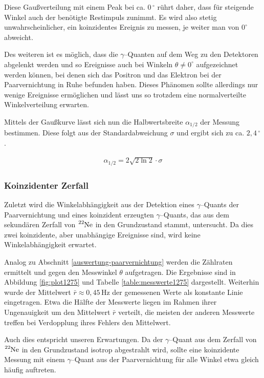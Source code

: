 \documentclass[12pt,a4paper]{scrartcl}
\numberwithin{equation}{section} %
\begin{document}
Diese Gaußverteilung mit einem Peak bei ca. $0\,^\circ$ rührt daher, dass für steigende Winkel auch der benötigte Restimpuls zunimmt. Es wird also stetig unwahrscheinlicher, ein koinzidentes Ereignis zu messen, je weiter man von $0^\circ$ abweicht.

Des weiteren ist es möglich, dass die $\gamma$--Quanten auf dem Weg zu den Detektoren abgelenkt werden und so Ereignisse auch bei Winkeln $\theta\neq 0^\circ$ aufgezeichnet werden können, bei denen sich das Positron und das Elektron bei der Paarvernichtung in Ruhe befunden haben. Dieses Phänomen sollte allerdings nur wenige Ereignisse ermöglichen und lässt uns so trotzdem eine normalverteilte Winkelverteilung erwarten.

Mittels der Gaußkurve lässt sich nun die Halbwertsbreite $\alpha_{1/2}$ der Messung bestimmen. Diese folgt aus der Standardabweichung $\sigma$ und ergibt sich zu ca. $2,4 \mathrm{\, ^\circ}$.

\begin{eqnarray}
	\alpha_{1/2} = 2 \sqrt{2 \ln 2} \cdot \sigma
\end{eqnarray}

\subsubsection{Koinzidenter Zerfall}
Zuletzt wird die Winkelabhängigkeit aus der Detektion eines $\gamma$--Quants der Paarvernichtung und eines koinzident erzeugten $\gamma$--Quants, das aus dem sekundären Zerfall von $\ce{^{22}Ne}$ in den Grundzustand stammt, untersucht. Da dies zwei koinzidente, aber unabhängige Ereignisse sind, wird keine Winkelabhängigkeit erwartet.

Analog zu Abschnitt \ref{auswertung-paarvernichtung} werden die Zählraten ermittelt und gegen den Messwinkel $\theta$ aufgetragen. Die Ergebnisse sind in Abbildung \ref{fig:plot1275} und Tabelle \ref{table:messwerte1275} dargestellt. Weiterhin wurde der Mittelwert $\bar r\approx 0,45\,\mathrm{Hz}$ der gemessenen Werte als konstante Linie eingetragen. Etwa die Hälfte der Messwerte liegen im Rahmen ihrer Ungenauigkeit um den Mittelwert $\bar r$ verteilt, die meisten der anderen Messwerte treffen bei Verdopplung ihres Fehlers den Mittelwert.

Auch dies entspricht unseren Erwartungen. Da der $\gamma$--Quant aus dem Zerfall von $\ce{^{22}Ne}$ in den Grundzustand isotrop abgestrahlt wird, sollte eine koinzidente Messung mit einem $\gamma$--Quant aus der Paarvernichtung für alle Winkel etwa gleich häufig auftreten.
\end{document}
